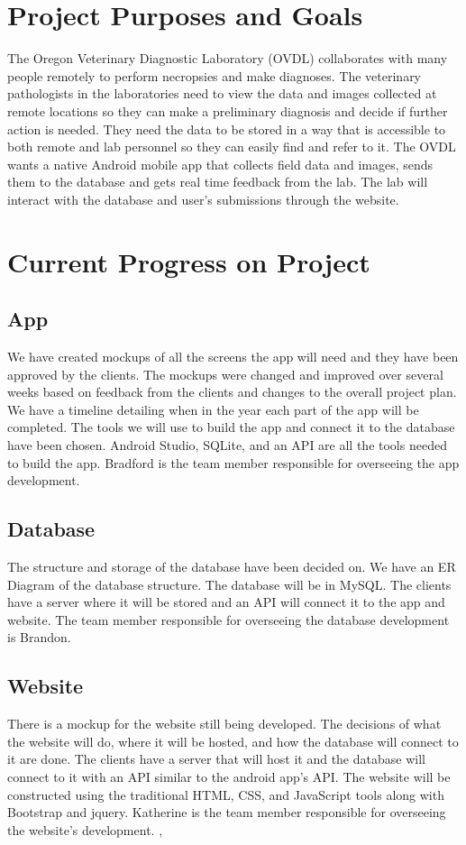 \documentclass[onecolumn, draftclsnofoot,10pt, compsoc]{IEEEtran}
\begin{document}
\section{Project Purposes and Goals}
The Oregon Veterinary Diagnostic Laboratory (OVDL) collaborates with many people remotely to perform necropsies and make diagnoses. The veterinary pathologists in the laboratories need to view the data and images collected at remote locations so they can make a preliminary diagnosis and decide if further action is needed. They need the data to be stored in a way that is accessible to both remote and lab personnel so they can easily find and refer to it. The OVDL wants a native Android mobile app that collects field data and images, sends them to the database and gets real time feedback from the lab. The lab will interact with the database and user's submissions through the website. 


\section{Current Progress on Project}
\subsection{App}
We have created mockups of all the screens the app will need and they have been approved by the clients. The mockups were changed and improved over several weeks based on feedback from the clients and changes to the overall project plan. We have a timeline detailing when in the year each part of the app will be completed. The tools we will use to build the app and connect it to the database have been chosen. Android Studio, SQLite, and an API are all the tools needed to build the app. Bradford is the team member responsible for overseeing the app development. 


\subsection{Database}
The structure and storage of the database have been decided on. We have an ER Diagram of the database structure. The database will be in MySQL. The clients have a server where it will be stored and an API will connect it to the app and website. The team member responsible for overseeing the database development is Brandon. 


\subsection{Website}
There is a mockup for the website still being developed. The decisions of what the website will do, where it will be hosted, and how the database will connect to it are done. The clients have a server that will host it and the database will connect to it with an API similar to the android app's API. The website will be constructed using the traditional HTML, CSS, and JavaScript tools along with Bootstrap and jquery. Katherine is the team member responsible for overseeing the website's development. ,
\end{document}
